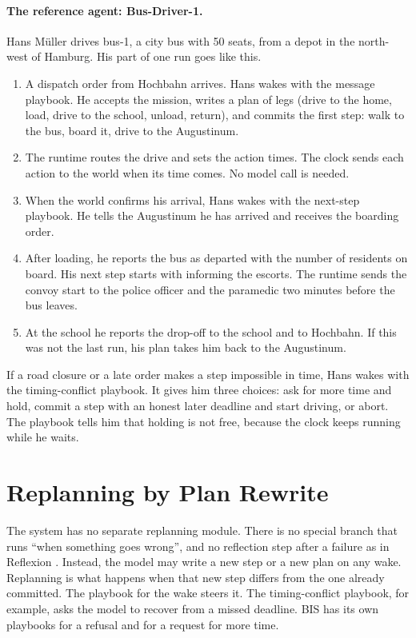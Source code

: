 \paragraph{The reference agent: Bus-Driver-1.} Hans Müller drives bus-1, a city
bus with 50 seats, from a depot in the north-west of Hamburg. His part of one
run goes like this.
\begin{enumerate}
  \item A dispatch order from Hochbahn arrives. Hans wakes with the
  message playbook. He accepts the mission, writes a plan of legs (drive to the
  home, load, drive to the school, unload, return), and commits the first step:
  walk to the bus, board it, drive to the Augustinum.
  \item The runtime routes the drive and sets the action times. The clock sends
  each action to the world when its time comes. No model call is needed.
  \item When the world confirms his arrival, Hans wakes with the next-step
  playbook. He tells the Augustinum he has arrived and receives the boarding
  order.
  \item After loading, he reports the bus as departed with the number of
  residents on board. His next step starts with informing the escorts. The
  runtime sends the convoy start to the police officer and the paramedic two
  minutes before the bus leaves.
  \item At the school he reports the drop-off to the school and to Hochbahn.
  If this was not the last run, his plan takes him back to the Augustinum.
\end{enumerate}
If a road closure or a late order makes a step impossible in time, Hans wakes
with the timing-conflict playbook. It gives him three choices: ask for more time
and hold, commit a step with an honest later deadline and start driving, or
abort. The playbook tells him that holding is not free, because the clock keeps
running while he waits.

\section{Replanning by Plan Rewrite}
\label{sec:ag:replan}

The system has no separate replanning module. There is no special branch that
runs ``when something goes wrong'', and no reflection step after a failure as
in Reflexion \parencite{shinn2023}. Instead, the model may write a new step or a
new plan on any wake. Replanning is what happens when that new
step differs from the one already committed. The playbook for the wake steers
it. The timing-conflict playbook, for example, asks the model to recover from a
missed deadline. BIS has its own playbooks for a refusal and for a request for
more time.

